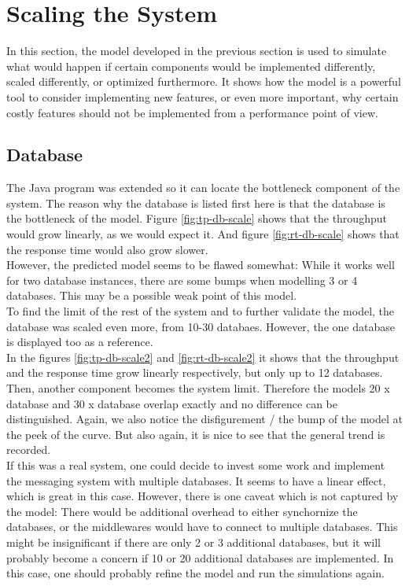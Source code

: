 \documentclass[a4paper]{article}
\begin{document}
{\section{Scaling the System}

In this section, the model developed in the previous section is used to simulate what would happen if certain components would be implemented differently, scaled differently, or optimized furthermore. It shows how the model is a powerful tool to consider implementing new features, or even more important, why certain costly features should not be implemented from a performance point of view.\\


\subsection{Database}

The Java program was extended so it can locate the bottleneck component of the system. The reason why the database is listed first here is that the database is the bottleneck of the model. Figure \ref{fig:tp-db-scale} shows that the throughput would grow linearly, as we would expect it. And figure \ref{fig:rt-db-scale} shows that the response time would also grow slower.\\

However, the predicted model seems to be flawed somewhat: While it works well for two database instances, there are some bumps when modelling 3 or 4 databases. This may be a possible weak point of this model.\\

To find the limit of the rest of the system and to further validate the model, the database was scaled even more, from 10-30 databaes. However, the one database is displayed too as a reference.\\

In the figures \ref{fig:tp-db-scale2} and \ref{fig:rt-db-scale2} it shows that the throughput and the response time grow linearly respectively, but only up to 12 databases. Then, another component becomes the system limit. Therefore the models 20 x database and 30 x database overlap exactly and no difference can be distinguished. Again, we also notice the disfigurement / the bump of the model at the peek of the curve. But also again, it is nice to see that the general trend is recorded.\\

If this was a real system, one could decide to invest some work and implement the messaging system with multiple databases. It seems to have a linear effect, which is great in this case. However, there is one caveat which is not captured by the model: There would be additional overhead to either synchornize the databases, or the middlewares would have to connect to multiple databases. This might be insignificant if there are only 2 or 3 additional databases, but it will probably become a concern if 10 or 20 additional databases are implemented. In this case, one should probably refine the model and run the simulations again.\\

}
\end{document}
